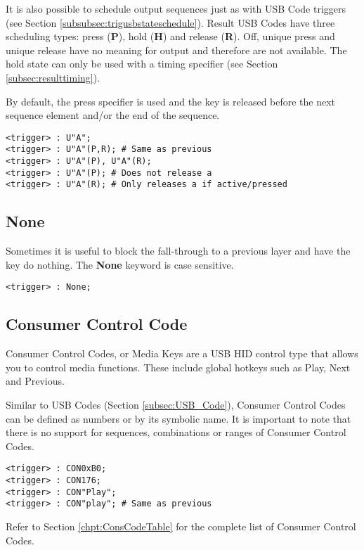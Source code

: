 \documentclass{kiibohd-template}
\begin{document}
It is also possible to schedule output sequences just as with USB Code triggers (see Section \ref{subsubsec:trigusbstateschedule}).
Result USB Codes have three scheduling types: press (\textbf{P}), hold (\textbf{H}) and release (\textbf{R}).
Off, unique press and unique release have no meaning for output and therefore are not available.
The hold state can only be used with a timing specifier (see Section \ref{subsec:resulttiming}).

By default, the press specifier is used and the key is released before the next sequence element and/or the end of the sequence.

\begin{lstlisting}
<trigger> : U"A";
<trigger> : U"A"(P,R); # Same as previous
<trigger> : U"A"(P), U"A"(R);
<trigger> : U"A"(P); # Does not release a
<trigger> : U"A"(R); # Only releases a if active/pressed
\end{lstlisting}


\subsection{None}

Sometimes it is useful to block the fall-through to a previous layer and have the key do nothing.
The \textbf{None} keyword is case sensitive.

\begin{lstlisting}
<trigger> : None;
\end{lstlisting}


\subsection{Consumer Control Code}

Consumer Control Codes, or Media Keys are a USB HID control type that allows you to control media functions.
These include global hotkeys such as Play, Next and Previous.

Similar to USB Codes (Section \ref{subsec:USB_Code}), Consumer Control Codes can be defined as numbers or by its symbolic name.
It is important to note that there is no support for sequences, combinations or ranges of Consumer Control Codes.

\begin{lstlisting}
<trigger> : CON0xB0;
<trigger> : CON176;
<trigger> : CON"Play";
<trigger> : CON"play"; # Same as previous
\end{lstlisting}

Refer to Section \ref{chpt:ConsCodeTable} for the complete list of Consumer Control Codes.
\end{document}
